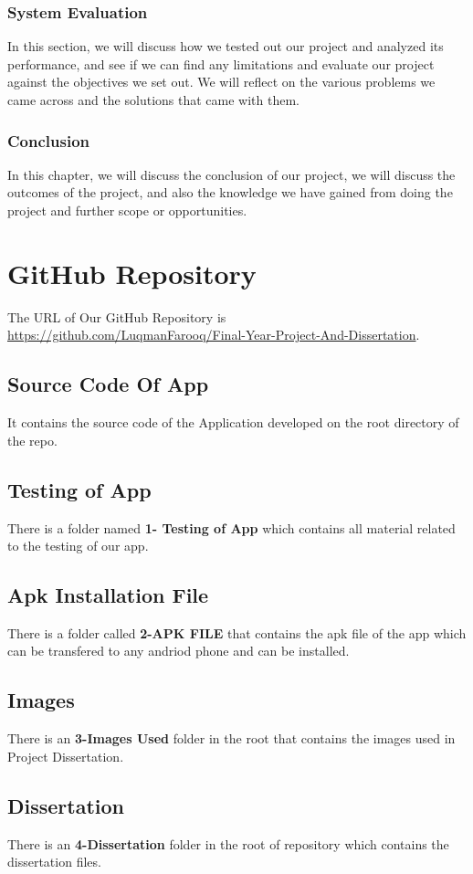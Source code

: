 \subsubsection{System Evaluation}
In this section, we will discuss how we tested out our project and analyzed its performance, and see if we can find any limitations and evaluate our project against the objectives we set out. We will reflect on the various problems we came across and the solutions that came with them.

\subsubsection{Conclusion}
In this chapter, we will discuss the conclusion of our project, we will discuss the outcomes of the project, and also the knowledge we have gained from doing the project and further scope or opportunities.

\section{GitHub Repository}
The URL of Our GitHub Repository is \url{https://github.com/LuqmanFarooq/Final-Year-Project-And-Dissertation}.
\subsection{Source Code Of App}
It contains the source code of the Application developed on the root directory of the repo.
\subsection{Testing of App}
There is a folder named \textbf{1- Testing of App} which contains all material related to the testing of our app.
\subsection{Apk Installation File}
There is a folder called \textbf{2-APK FILE} that contains the apk file of the app which can be transfered to any andriod phone and can be installed.
\subsection{Images}
There is an \textbf{3-Images Used} folder in the root that contains the images used in Project Dissertation.
\subsection{Dissertation}
There is an \textbf{4-Dissertation} folder in the root of repository which contains the dissertation files.
